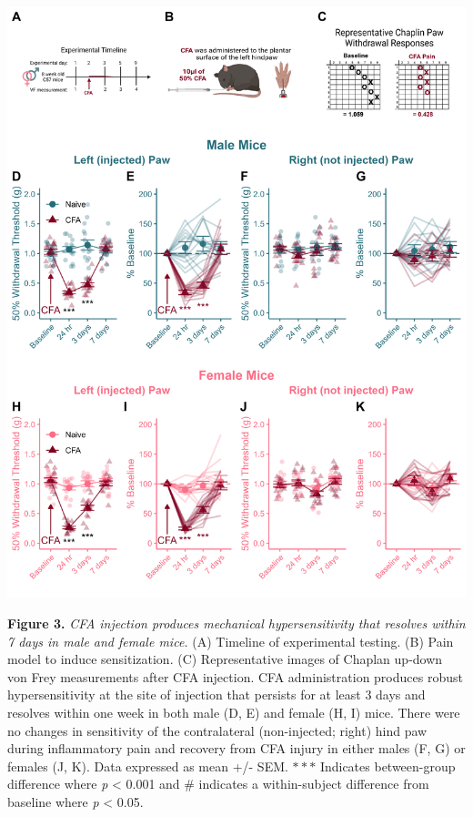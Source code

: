 \documentclass[
]{book}
\begin{document}
\begin{center}\includegraphics[width=68.06in]{Figs/3_VF_CFA_Recovery} \end{center}

\textbf{Figure 3.} \emph{CFA injection produces mechanical hypersensitivity that resolves within 7 days in male and female mice.} (A) Timeline of experimental testing. (B) Pain model to induce sensitization. (C) Representative images of Chaplan up-down von Frey measurements after CFA injection. CFA administration produces robust hypersensitivity at the site of injection that persists for at least 3 days and resolves within one week in both male (D, E) and female (H, I) mice. There were no changes in sensitivity of the contralateral (non-injected; right) hind paw during inflammatory pain and recovery from CFA injury in either males (F, G) or females (J, K). Data expressed as mean +/- SEM. \(***\) Indicates between-group difference where \emph{p} \textless{} 0.001 and \# indicates a within-subject difference from baseline where \emph{p} \textless{} 0.05.
\end{document}
